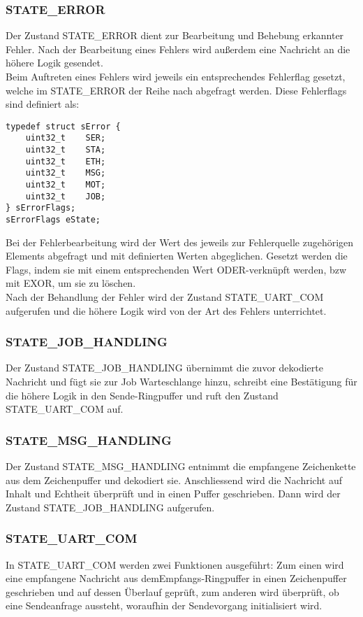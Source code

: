 \documentclass{scrartcl}
\begin{document}
\subsubsection{STATE\_ERROR}
Der Zustand STATE\_ERROR dient zur Bearbeitung und Behebung erkannter Fehler. Nach der Bearbeitung eines Fehlers wird außerdem eine Nachricht an die höhere Logik gesendet.
\\
Beim Auftreten eines Fehlers wird jeweils ein entsprechendes Fehlerflag gesetzt, welche im STATE\_ERROR der Reihe nach abgefragt werden. Diese Fehlerflags sind definiert als:
\begin{verbatim}
typedef struct sError {
	uint32_t	SER;
	uint32_t	STA;
	uint32_t	ETH;
	uint32_t	MSG;
	uint32_t	MOT;
	uint32_t	JOB;
} sErrorFlags;
sErrorFlags eState;
\end{verbatim}
Bei der Fehlerbearbeitung wird der Wert des jeweils zur Fehlerquelle zugehörigen Elements abgefragt und mit definierten Werten abgeglichen. Gesetzt werden die Flags, indem sie mit einem entsprechenden Wert ODER-verknüpft werden, bzw mit EXOR, um sie zu löschen.\\
Nach der Behandlung der Fehler wird der Zustand STATE\_UART\_COM aufgerufen und die höhere Logik wird von der Art des Fehlers unterrichtet.

\subsubsection{STATE\_JOB\_HANDLING}
Der Zustand STATE\_JOB\_HANDLING übernimmt die zuvor dekodierte Nachricht und fügt sie zur Job Warteschlange hinzu, schreibt eine Bestätigung für die höhere Logik in den Sende-Ringpuffer und ruft den Zustand STATE\_UART\_COM auf.

\subsubsection{STATE\_MSG\_HANDLING}
Der Zustand STATE\_MSG\_HANDLING entnimmt die empfangene Zeichenkette aus dem Zeichenpuffer und dekodiert sie. Anschliessend wird die Nachricht auf Inhalt und Echtheit überprüft und in einen Puffer geschrieben. Dann wird der Zustand STATE\_JOB\_HANDLING aufgerufen.


\subsubsection{STATE\_UART\_COM}
In STATE\_UART\_COM werden zwei Funktionen ausgeführt: Zum einen wird eine empfangene Nachricht aus demEmpfangs-Ringpuffer in einen Zeichenpuffer geschrieben und auf dessen Überlauf geprüft, zum anderen wird überprüft, ob eine Sendeanfrage aussteht, woraufhin der Sendevorgang initialisiert wird.
\end{document}
